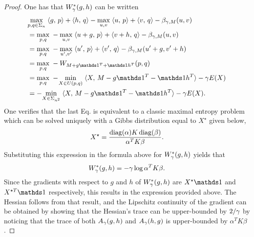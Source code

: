 \begin{proof}
One has that $W^*_\gamma(g,h)$ can be written
\begin{align*}
	 &\umax{p,q\in\Si_n} \dotp{g}{p} + \dotp{h}{q} - \umax{u,v} \dotp{u}{p} + \dotp{v}{q} - \beta_{\ga,M}(u,v)  \\
			 &= \umax{p,q}  -\umax{u,v} \dotp{u+g}{p}  + \dotp{v+h}{q} - \beta_{\ga,M}(u,v) \\
			 &= \umax{p,q}  -\umax{u',v'} \dotp{u'}{p} + \dotp{v'}{q} - \beta_{\ga,M}(u'+g,v'+h) \\
			 &= \umax{p,q}  -W_{M+g\ones^T + \ones h^T}(\p,\q) \\
			 &= \umax{p,q}  - \! \umin{X \in U(\p,\q)} \dotp{X}{M-g\ones^T - \ones h^T} - \ga E(X) \\			 
			 &= - \umin{X\in\Sigma_{n^2}} \dotp{X}{M-g\ones^T - \ones h^T} - \ga E(X).
\end{align*}
One verifies that the last Eq. is equivalent to a classic maximal entropy problem which can be solved uniquely with a Gibbs distribution equal to $X^\star$ given below,
	$$X^\star = \frac{\diag(\alpha) K \diag(\beta)}{\alpha^T K \beta}.$$%
Substituting this expression in the formula above for $W^*_\gamma(g,h)$ yields that
$$
W^*_\gamma(g,h) = -\gamma \log \alpha^TK\beta.
$$
Since the gradients with respect to $g$ and $h$ of $W^*_\gamma(g,h)$ are $X^\star \ones$ and $X^{\star T}\ones$ respectively, this results in the expression provided above. The Hessian follows from that result, and the Lipschitz continuity of the gradient can be obtained by showing that the Hessian's trace can be upper-bounded by $2/\gamma$ by noticing that the trace of both $A_\gamma(g,h)$ and $A_\gamma(h,g)$ is upper-bounded by $\alpha^TK\beta$.
\end{proof}